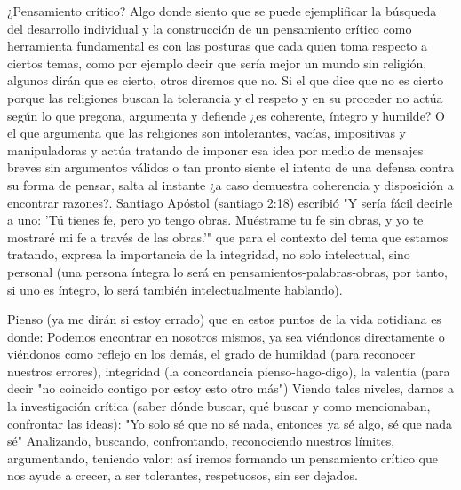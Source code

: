 ¿Pensamiento crítico?
Algo donde siento que se puede ejemplificar la búsqueda del desarrollo individual y la construcción de un pensamiento crítico como herramienta fundamental es con las posturas que cada quien toma respecto a ciertos temas, como por ejemplo decir que sería mejor un mundo sin religión, algunos dirán que es cierto, otros diremos que no. Si el que dice que no es cierto porque las religiones buscan la tolerancia y el respeto y en su proceder no actúa según lo que pregona, argumenta y defiende ¿es coherente, íntegro y humilde? O el que argumenta que las religiones son intolerantes, vacías, impositivas y manipuladoras y actúa tratando de imponer esa idea por medio de mensajes breves sin argumentos válidos o tan pronto siente el intento de una defensa contra su forma de pensar, salta al instante ¿a caso demuestra coherencia y disposición a encontrar razones?. Santiago Apóstol (santiago 2:18) escribió "Y sería fácil decirle a uno: 'Tú tienes fe, pero yo tengo obras. Muéstrame tu fe sin obras, y yo te mostraré mi fe a través de las obras.'" que para el contexto del tema que estamos tratando, expresa la importancia de la integridad, no solo intelectual, sino personal (una persona íntegra lo será en pensamientos-palabras-obras, por tanto, si uno es íntegro, lo será también intelectualmente hablando).

Pienso (ya me dirán si estoy errado) que en estos puntos de la vida cotidiana es donde:
Podemos encontrar en nosotros mismos, ya sea viéndonos directamente o viéndonos como reflejo en los demás, el grado de humildad (para reconocer nuestros errores), integridad (la concordancia pienso-hago-digo), la valentía (para decir "no coincido contigo por estoy esto otro más")
Viendo tales niveles, darnos a la investigación crítica (saber dónde buscar, qué buscar y como mencionaban, confrontar las ideas): "Yo solo sé que no sé nada, entonces ya sé algo, sé que nada sé"
Analizando, buscando, confrontando, reconociendo nuestros límites, argumentando, teniendo valor: así iremos formando un pensamiento crítico que nos ayude a crecer, a ser tolerantes, respetuosos, sin ser dejados.
